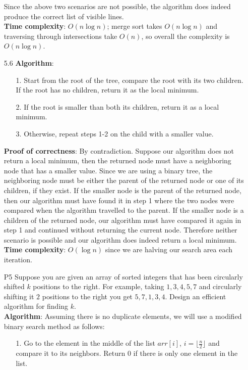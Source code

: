 \documentclass{article}
\begin{document}
\begin{itemize}
\begin{itemize}
            \end{itemize}
            Since the above two scenarios are not possible, the algorithm does indeed produce the correct list of visible lines.\\
            \textbf{Time complexity}: $O(n\log n)$; merge sort takes $O(n\log n)$ and traversing through intersections take $O(n)$, so overall the complexity is $O(n\log n)$.
      \item [5.6]
            \textbf{Algorithm}:
            \begin{itemize}
                  \item [1.] Start from the root of the tree, compare the root with its two children. If the root has no children, return it as the local minimum.
                  \item [2.] If the root is smaller than both its children, return it as a local minimum.
                  \item [3.] Otherwise, repeat steps 1-2 on the child with a smaller value.
            \end{itemize}
            \textbf{Proof of correctness}: By contradiction. Suppose our algorithm does not return a local minimum, then the returned node must have a neighboring node that has a smaller value. Since we are using a binary tree, the neighboring node must be either the parent of the returned node or one of its children, if they exist. If the smaller node is the parent of the returned node, then our algorithm must have found it in step 1 where the two nodes were compared when the algorithm travelled to the parent. If the smaller node is a children of the returned node, our algorithm must have compared it again in step 1 and continued without returning the current node. Therefore neither scenario is possible and our algorithm does indeed return a local minimum.\\
            \textbf{Time complexity}: $O(\log n)$ since we are halving our search area each iteration.
      \item [P5] Suppose you are given an array of sorted integers that has been circularly shifted $k$ positions to the right. For example, taking $1,3,4,5,7$ and circularly shifting it $2$ positions to the right you get $5,7,1,3,4$. Design an efficient algorithm for finding $k$.\\
            \textbf{Algorithm}: Assuming there is no duplicate elements, we will use a modified binary search method as follows:
            \begin{itemize}
                  \item [1.] Go to the element in the middle of the list $arr[i]$, $i=\lfloor\frac{n}{2}\rfloor$ and compare it to its neighbors. Return 0 if there is only one element in the list.

\end{itemize}
\end{itemize}
\end{document}
